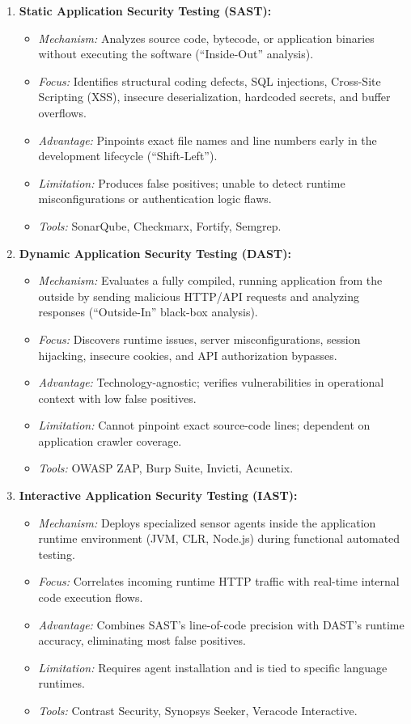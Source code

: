 \begin{enumerate}
\item \textbf{Static Application Security Testing (SAST):}
\begin{itemize}
\item \textit{Mechanism:} Analyzes source code, bytecode, or application binaries without executing the software (``Inside-Out'' analysis).
\item \textit{Focus:} Identifies structural coding defects, SQL injections, Cross-Site Scripting (XSS), insecure deserialization, hardcoded secrets, and buffer overflows.
\item \textit{Advantage:} Pinpoints exact file names and line numbers early in the development lifecycle (``Shift-Left'').
\item \textit{Limitation:} Produces false positives; unable to detect runtime misconfigurations or authentication logic flaws.
\item \textit{Tools:} SonarQube, Checkmarx, Fortify, Semgrep.
\end{itemize}

\item \textbf{Dynamic Application Security Testing (DAST):}
\begin{itemize}
\item \textit{Mechanism:} Evaluates a fully compiled, running application from the outside by sending malicious HTTP/API requests and analyzing responses (``Outside-In'' black-box analysis).
\item \textit{Focus:} Discovers runtime issues, server misconfigurations, session hijacking, insecure cookies, and API authorization bypasses.
\item \textit{Advantage:} Technology-agnostic; verifies vulnerabilities in operational context with low false positives.
\item \textit{Limitation:} Cannot pinpoint exact source-code lines; dependent on application crawler coverage.
\item \textit{Tools:} OWASP ZAP, Burp Suite, Invicti, Acunetix.
\end{itemize}

\item \textbf{Interactive Application Security Testing (IAST):}
\begin{itemize}
\item \textit{Mechanism:} Deploys specialized sensor agents inside the application runtime environment (JVM, CLR, Node.js) during functional automated testing.
\item \textit{Focus:} Correlates incoming runtime HTTP traffic with real-time internal code execution flows.
\item \textit{Advantage:} Combines SAST's line-of-code precision with DAST's runtime accuracy, eliminating most false positives.
\item \textit{Limitation:} Requires agent installation and is tied to specific language runtimes.
\item \textit{Tools:} Contrast Security, Synopsys Seeker, Veracode Interactive.
\end{itemize}


\end{enumerate}
